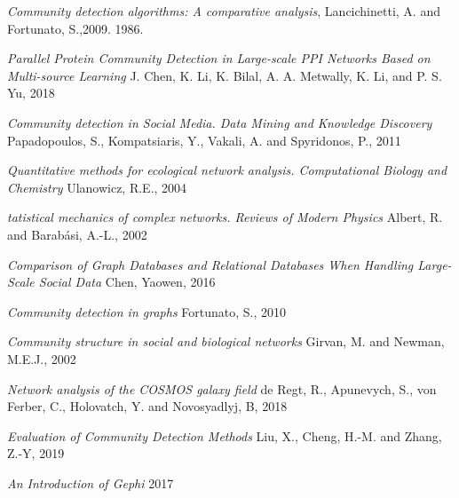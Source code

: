 \documentclass[12pt]{article}
\begin{document}
\pagebreak
\begin{thebibliography}{100}

  
    \textit{Community detection algorithms: A comparative analysis},
    Lancichinetti, A. and Fortunato, S.,2009.
    1986.
  
    \textit{Parallel Protein Community Detection in
    Large-scale PPI Networks Based on
    Multi-source Learning}
    J. Chen, K. Li, K. Bilal, A. A. Metwally, K. Li, and P. S. Yu,
    2018
    
    \textit{Community detection in Social Media. Data Mining and Knowledge Discovery}
    Papadopoulos, S., Kompatsiaris, Y., Vakali, A. and Spyridonos, P.,
    2011
    
    \textit{Quantitative methods for ecological network analysis. Computational Biology and Chemistry}
    Ulanowicz, R.E.,
    2004
    
    \textit{tatistical mechanics of complex networks. Reviews of Modern Physics}
    Albert, R. and Barabási, A.-L.,
    2002
    
    \textit{Comparison of Graph Databases and Relational Databases When Handling Large-Scale Social Data}
    Chen, Yaowen,
    2016
    
    \textit{Community detection in graphs}
    Fortunato, S.,
    2010
    
    \textit{Community structure in social and biological networks}
    Girvan, M. and Newman, M.E.J.,
    2002
    
    \textit{Network analysis of the COSMOS galaxy field}
    de Regt, R., Apunevych, S., von Ferber, C., Holovatch, Y. and Novosyadlyj, B,
    2018
    
    \textit{Evaluation of Community Detection Methods}
    Liu, X., Cheng, H.-M. and Zhang, Z.-Y,
    2019
    
    \textit{An Introduction of Gephi}
    2017




        
\end{thebibliography}
\end{document}
